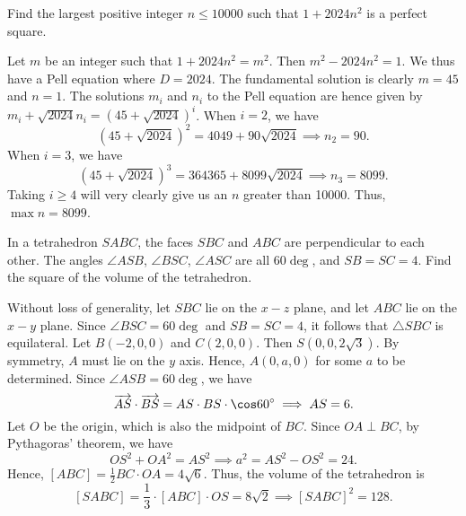 \begin{question}[8099]\label{A::2024-S-1-12}
    Find the largest positive integer $n \leq 10000$ such that $1 + 2024n^2$ is a perfect square.
\end{question}

Let $m$ be an integer such that $1 + 2024n^2 = m^2$. Then $m^2 - 2024n^2 = 1$. We thus have a Pell equation where $D = 2024$. The fundamental solution is clearly $m = 45$ and $n = 1$. The solutions $m_i$ and $n_i$ to the Pell equation are hence given by $m_i + \sqrt{2024}n_i = (45 + \sqrt{2024})^i$. When $i = 2$, we have \[(45 + \sqrt{2024})^2 = 4049 + 90\sqrt{2024} \implies n_2 = 90.\] When $i = 3$, we have \[(45 + \sqrt{2024})^3 = 364365 + 8099\sqrt{2024} \implies n_3 = 8099.\] Taking $i \geq 4$ will very clearly give us an $n$ greater than 10000. Thus, $\max n = 8099$.

\begin{question}[128]\label{A::2024-S-1-13}
    In a tetrahedron $SABC$, the faces $SBC$ and $ABC$ are perpendicular to each other. The angles $\angle ASB$, $\angle BSC$, $\angle ASC$ are all $60\deg$, and $SB = SC = 4$. Find the square of the volume of the tetrahedron.

    \begin{center}
    \end{center}
\end{question}

Without loss of generality, let $SBC$ lie on the $x-z$ plane, and let $ABC$ lie on the $x-y$ plane. Since $\angle BSC = 60\deg$ and $SB = SC = 4$, it follows that $\triangle SBC$ is equilateral. Let $B(-2, 0, 0)$ and $C(2, 0, 0)$. Then $S(0, 0, 2\sqrt3)$. By symmetry, $A$ must lie on the $y$ axis. Hence, $A(0, a, 0)$ for some $a$ to be determined. Since $\angle ASB = 60\deg$, we have \[\oa{AS} \dotp \oa{BS} = AS \cdot BS \cdot \cos 60\deg \implies AS = 6.\] Let $O$ be the origin, which is also the midpoint of $BC$. Since $OA \perp BC$, by Pythagoras' theorem, we have \[OS^2 + OA^2 = AS^2 \implies a^2 = AS^2 - OS^2 = 24.\] Hence, $[ABC] = \frac12 BC \cdot OA = 4\sqrt6$. Thus, the volume of the tetrahedron is \[[SABC] = \frac13 \cdot [ABC] \cdot OS = 8\sqrt{2} \implies [SABC]^2 = 128.\]


